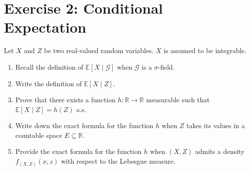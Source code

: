\documentclass[12pt]{article}
\begin{document}
\section*{Exercise 2: Conditional Expectation}
Let $X$ and $Z$ be two real-valued random variables. $X$ is assumed to be integrable.

\begin{enumerate}
    \item Recall the definition of $\mathbb{E}[X \mid \mathcal{G}]$ when $\mathcal{G}$ is a $\sigma$-field.
    \item Write the definition of $\mathbb{E}[X \mid Z]$.
    \item Prove that there exists a function $h : \mathbb{R} \to \mathbb{R}$ measurable such that $\mathbb{E}[X \mid Z] = h(Z)$ a.s.
    \item Write down the exact formula for the function $h$ when $Z$ takes its values in a countable space $E \subseteq \mathbb{R}$.
    \item Provide the exact formula for the function $h$ when $(X, Z)$ admits a density $f_{(X,Z)}(x, z)$ with respect to the Lebesgue measure.
\end{enumerate}
\end{document}
